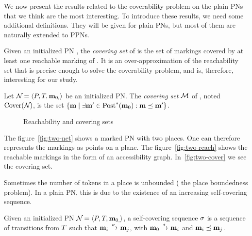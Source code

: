 We now present the results related to the coverability problem on the plain \acp{PN} that we think are the most interesting.
To introduce these results, we need some additional definitions.
They will be given for plain \acp{PN}, but most of them are naturally extended to \acp{PPN}.

Given an initialized \ac{PN} \namePN, the \emph{covering set} of \namePN is the set of markings covered by at least one reachable marking of \namePN.
It is an over-approximation of the reachability set that is precise enough to solve the coverability problem, and is, therefore, interesting for our study.

\begin{defi}
  Let $\mathcal{N}_{} = \left\langle P_{}, T_{}, \mathbf{m}_{0,}\right\rangle$ be an initialized \ac{PN}.
  The \emph{covering set} $\mathcal{M}$ of \namePN, noted $\operatorname{Cover}(\mathcal{N}_{})$, is the set $\left\{\mathbf{m} \mid \exists \mathbf{m}' \in \operatorname{Post}^*_{}(\mathbf{m}_0) : \mathbf{m} \preceq \mathbf{m}' \right\}$.
\end{defi}


\begin{figure}[htbp]
  \label{fig:reach-and-cover-example}
  \centering
  \subfloat[A \ac{PN} ($\card{\places} = 2$)]{
    \label{fig:two-net}
    

  }

  \qquad
  \caption{Reachability and covering sets}
\end{figure}

The figure~\ref{fig:two-net} shows a marked \ac{PN} with two places.
One can therefore represents the markings as points on a plane.
The figure~\ref{fig:two-reach} shows the reachable markings in the form of an accessibility graph.
In~\ref{fig:two-cover} we see the covering set.

Sometimes the number of tokens in a place is unbounded ( the place boundedness problem).
In a plain \ac{PN}, this is due to the existence of an increasing self-covering sequence.
\begin{defi}
  Given an initialized \ac{PN} $\mathcal{N}_{} = \left\langle P_{}, T_{}, \mathbf{m}_{0,}\right\rangle$,
  a self-covering sequence $\seqt$ is a sequence of transitions from $T$ such that 
  \(
    \mar_i \fire{\seqt} \mar_j
  \),
  with $\mathbf{m}_0 \xrightarrow{*}_{} \mathbf{m}_i$ %
  and $\mathbf{m}_i \preceq \mathbf{m}_j$.
\end{defi}


